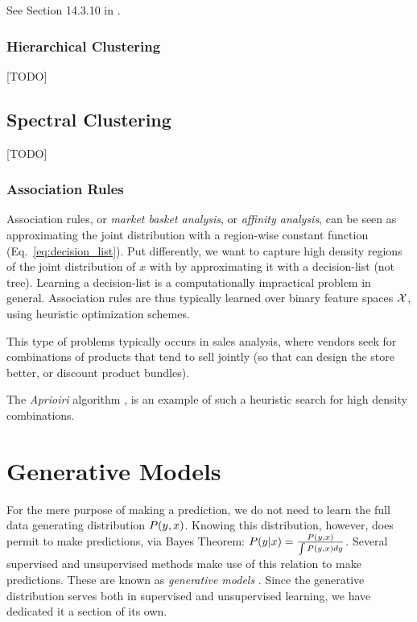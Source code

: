 See Section 14.3.10 in \cite{hastie_elements_2003}.


\subsubsection{Hierarchical Clustering}
\label{sec:hierarchical}
[TODO]


\subsection{Spectral Clustering}
[TODO]


\subsubsection{Association Rules}
\label{sec:association}
Association rules, or \emph{market basket analysis}, or \emph{affinity analysis}, can be seen as approximating the joint distribution with a region-wise constant function (Eq.~\ref{eq:decision_list}).
Put differently, we want to capture high density regions of the joint distribution of $x$ with by approximating it with a decision-list (not tree).
Learning a decision-list is a computationally impractical problem in general. Association rules are thus typically learned over binary feature spaces $\mathcal{X}$, using heuristic optimization schemes.

This type of problems typically occurs in sales analysis, where vendors seek for combinations of products that tend to sell jointly (so that can design the store better, or discount product bundles).

The \emph{Aprioiri} algorithm \cite{agraval_fast_1994}, is an example of such a heuristic search for high density combinations.








\section{Generative Models}
For the mere purpose of making a prediction, we do not need to learn the full data generating distribution $P(y,x)$. 
Knowing this distribution, however, does permit to make predictions, via Bayes Theorem: 
$P(y|x)=\frac{P(y,x)}{\int P(y,x)dy}$.
Several supervised and unsupervised methods make use of this relation to make predictions. These are known as \emph{generative models} .
Since the generative distribution serves both in supervised and unsupervised learning, we have dedicated it a section of its own.


